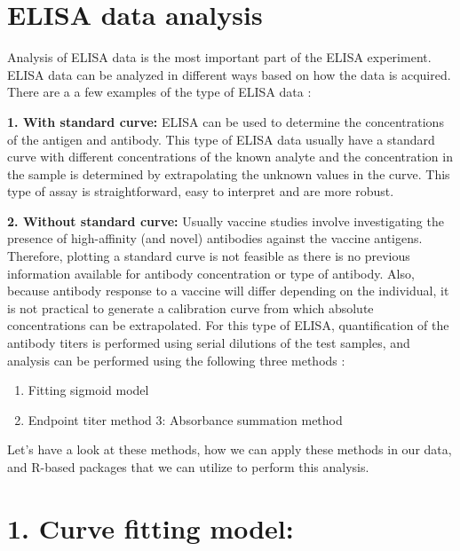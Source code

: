 \documentclass[
]{book}
\providecommand{\tightlist}{%
  \setlength{\itemsep}{0pt}\setlength{\parskip}{0pt}}
\begin{document}
\hypertarget{elisa-data-analysis}{%
\section{ELISA data analysis}\label{elisa-data-analysis}}

Analysis of ELISA data is the most important part of the ELISA experiment. ELISA data can be analyzed in different ways based on how the data is acquired. There are a a few examples of the type of ELISA data :

\textbf{1. With standard curve:} ELISA can be used to determine the concentrations of the antigen and antibody. This type of ELISA data usually have a standard curve with
different concentrations of the known analyte and the concentration in the sample is determined by extrapolating the unknown values in the curve. This type of assay is straightforward, easy to interpret and are more robust.

\textbf{2. Without standard curve:} Usually vaccine studies involve investigating the presence of high-affinity (and novel) antibodies against the vaccine antigens.
Therefore, plotting a standard curve is not feasible as there is no previous information available for antibody concentration or type of antibody. Also, because antibody response to a vaccine will differ depending on the individual,
it is not practical to generate a calibration curve from which absolute concentrations can be extrapolated.
For this type of ELISA, quantification of the antibody titers is performed using serial dilutions of the test samples, and analysis can be performed using the following three methods \citep{hartman2018absorbance}:

\begin{enumerate}
\def\labelenumi{\arabic{enumi}.}
\tightlist
\item
  Fitting sigmoid model
\item
  Endpoint titer method
  3: Absorbance summation method
\end{enumerate}

Let's have a look at these methods, how we can apply these methods in our data, and R-based packages that we can utilize to perform this analysis.

\hypertarget{curve-fitting-model}{%
\section{\texorpdfstring{\textbf{1. Curve fitting model:}}{1. Curve fitting model:}}\label{curve-fitting-model}}
\end{document}
